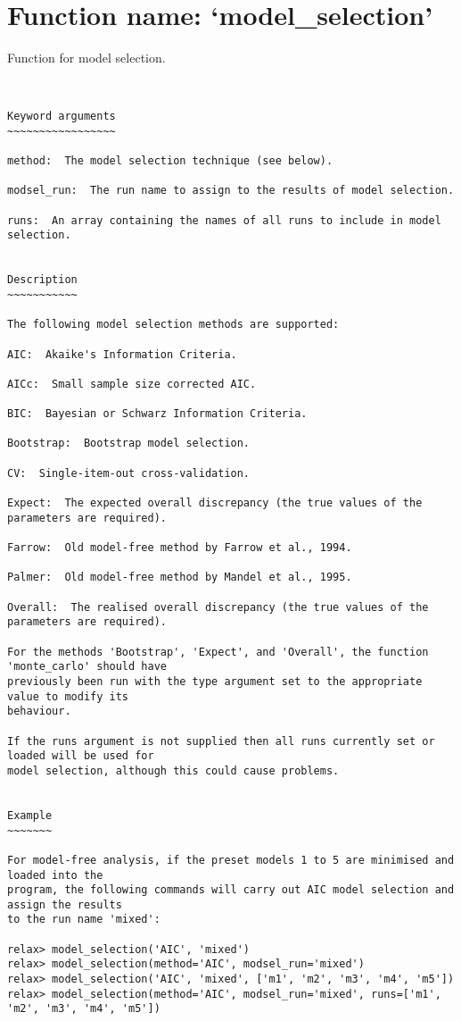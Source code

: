 \section{Function name: `model\_selection'}

Function for model selection.
\scriptsize
\begin{verbatim}


Keyword arguments
~~~~~~~~~~~~~~~~~

method:  The model selection technique (see below).

modsel_run:  The run name to assign to the results of model selection.

runs:  An array containing the names of all runs to include in model selection.


Description
~~~~~~~~~~~

The following model selection methods are supported:

AIC:  Akaike's Information Criteria.

AICc:  Small sample size corrected AIC.

BIC:  Bayesian or Schwarz Information Criteria.

Bootstrap:  Bootstrap model selection.

CV:  Single-item-out cross-validation.

Expect:  The expected overall discrepancy (the true values of the parameters are required).

Farrow:  Old model-free method by Farrow et al., 1994.

Palmer:  Old model-free method by Mandel et al., 1995.

Overall:  The realised overall discrepancy (the true values of the parameters are required).

For the methods 'Bootstrap', 'Expect', and 'Overall', the function 'monte_carlo' should have
previously been run with the type argument set to the appropriate value to modify its
behaviour.

If the runs argument is not supplied then all runs currently set or loaded will be used for
model selection, although this could cause problems.


Example
~~~~~~~

For model-free analysis, if the preset models 1 to 5 are minimised and loaded into the
program, the following commands will carry out AIC model selection and assign the results
to the run name 'mixed':

relax> model_selection('AIC', 'mixed')
relax> model_selection(method='AIC', modsel_run='mixed')
relax> model_selection('AIC', 'mixed', ['m1', 'm2', 'm3', 'm4', 'm5'])
relax> model_selection(method='AIC', modsel_run='mixed', runs=['m1', 'm2', 'm3', 'm4', 'm5'])

\end{verbatim}

\normalsize
